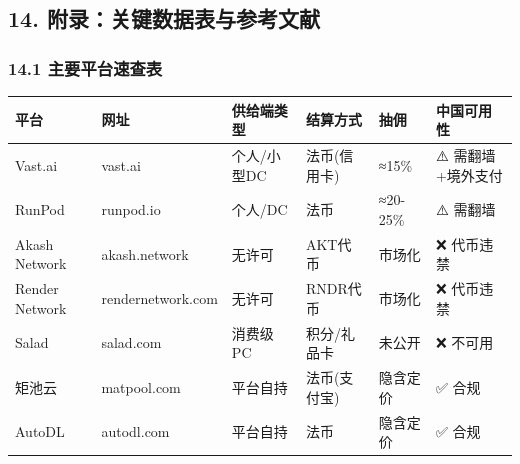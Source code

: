 \documentclass[UTF8,a4paper,12pt]{ctexart}
\begin{document}
\pagebreak

\subsection{14.
附录：关键数据表与参考文献}\label{ux9644ux5f55ux5173ux952eux6570ux636eux8868ux4e0eux53c2ux8003ux6587ux732e}

\subsubsection{14.1
主要平台速查表}\label{ux4e3bux8981ux5e73ux53f0ux901fux67e5ux8868}

{\def\LTcaptype{none} %
\begin{longtable}[]{@{}
  >{\raggedright\arraybackslash}p{}
  >{\raggedright\arraybackslash}p{}
  >{\raggedright\arraybackslash}p{}
  >{\raggedright\arraybackslash}p{}
  >{\raggedright\arraybackslash}p{}
  >{\raggedright\arraybackslash}p{}@{}}
\toprule\noalign{}
\begin{minipage}[b]{\linewidth}\raggedright
平台
\end{minipage} & \begin{minipage}[b]{\linewidth}\raggedright
网址
\end{minipage} & \begin{minipage}[b]{\linewidth}\raggedright
供给端类型
\end{minipage} & \begin{minipage}[b]{\linewidth}\raggedright
结算方式
\end{minipage} & \begin{minipage}[b]{\linewidth}\raggedright
抽佣
\end{minipage} & \begin{minipage}[b]{\linewidth}\raggedright
中国可用性
\end{minipage} \\
\midrule\noalign{}
\endhead
\bottomrule\noalign{}
\endlastfoot
Vast.ai & vast.ai & 个人/小型DC & 法币(信用卡) & ≈15\% & ⚠️
需翻墙+境外支付 \\
RunPod & runpod.io & 个人/DC & 法币 & ≈20-25\% & ⚠️ 需翻墙 \\
Akash Network & akash.network & 无许可 & AKT代币 & 市场化 & ❌
代币违禁 \\
Render Network & rendernetwork.com & 无许可 & RNDR代币 & 市场化 & ❌
代币违禁 \\
Salad & salad.com & 消费级PC & 积分/礼品卡 & 未公开 & ❌ 不可用 \\
矩池云 & matpool.com & 平台自持 & 法币(支付宝) & 隐含定价 & ✅ 合规 \\
AutoDL & autodl.com & 平台自持 & 法币 & 隐含定价 & ✅ 合规 \\
\end{longtable}
}
\end{document}
